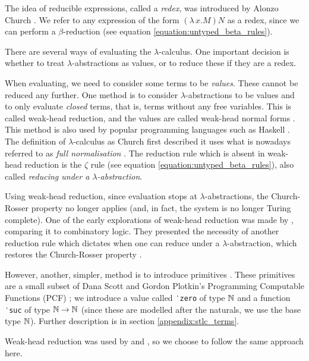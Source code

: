 The idea of reducible expressions, called a \textit{redex}, was introduced by Alonzo Church
\cite[p.~56]{pierce_types_2002}. We refer to any expression of the form $(\lambda \, x. M) N$ as a
redex, since we can perform a $\beta$-reduction (see equation \ref{equation:untyped_beta_rules}).

There are several ways of evaluating the $\lambda$-calculus. One important decision is whether to
treat $\lambda$-abstractions as values, or to reduce these if they are a redex.

When evaluating, we need to consider some terms to be \textit{values}. These cannot be reduced any
further. One method is to consider $\lambda$-abstractions to be values and to only evaluate
\textit{closed} terms, that is, terms without any free variables. This is called weak-head
reduction, and the values are called weak-head normal forms \citep{wadler_programming_2022}. This
method is also used by popular programming languages such as Haskell \citep{hutchison_sharing_2005}.
The definition of $\lambda$-calculus as Church first described it uses what is nowadays referred to
as \textit{full normalisation} \citep{wadler_programming_2022}. The reduction rule which is absent
in weak-head reduction is the $\zeta$ rule (see equation \ref{equation:untyped_beta_rules}), also
called \textit{reducing under a $\lambda$-abstraction}.

Using weak-head reduction, since evaluation stops at $\lambda$-abstractions, the Church-Rosser
property no longer applies (and, in fact, the system is no longer Turing complete). One of the early
explorations of weak-head reduction was made by \citet{cagman_combinatory_1998}, comparing it to
combinatory logic. They presented the necessity of another reduction rule which dictates when one
can reduce under a $\lambda$-abstraction, which restores the Church-Rosser property
\citep{hutchison_sharing_2005}.

However, another, simpler, method is to introduce primitives \citep{wadler_programming_2022}. These
primitives are a small subset of Dana Scott and Gordon Plotkin's Programming Computable Functions
(PCF) \citep{plotkin_lcf_1977}; we introduce a value called \texttt{‵zero} of type $\operatorname{\mathbb{N}}$ and a
function \texttt{‵suc} of type $\operatorname{\mathbb{N}} \to \operatorname{\mathbb{N}}$ (since these are modelled after the naturals, we use
the base type $\operatorname{\mathbb{N}}$). Further description is in section \ref{appendix:stlc_terms}.

Weak-head reduction was used by \citet{chargueraud_locally_2012} and
\citet[chapter~Lambda]{wadler_programming_2022}, so we choose to follow the same approach here.
